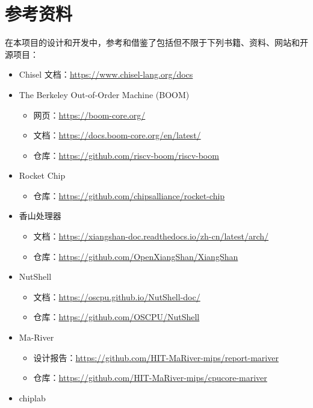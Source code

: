 \documentclass{article}
\begin{document}
\section{参考资料}
在本项目的设计和开发中，参考和借鉴了包括但不限于下列书籍、资料、网站和开源项目：
\begin{itemize}
    \item Chisel 文档：\url{https://www.chisel-lang.org/docs}
    \item The Berkeley Out-of-Order Machine (BOOM)
        \begin{itemize}
            \item 网页：\url{https://boom-core.org/}
            \item 文档：\url{https://docs.boom-core.org/en/latest/}
            \item 仓库：\url{https://github.com/riscv-boom/riscv-boom}
        \end{itemize}
    \item Rocket Chip
        \begin{itemize}
            \item 仓库：\url{https://github.com/chipsalliance/rocket-chip}
        \end{itemize}
    \item 香山处理器
        \begin{itemize}
            \item 文档：\url{https://xiangshan-doc.readthedocs.io/zh-cn/latest/arch/}
            \item 仓库：\url{https://github.com/OpenXiangShan/XiangShan}
        \end{itemize}
    \item NutShell
        \begin{itemize}
            \item 文档：\url{https://oscpu.github.io/NutShell-doc/}
            \item 仓库：\url{https://github.com/OSCPU/NutShell}
        \end{itemize}
    \item Ma-River
        \begin{itemize}
            \item 设计报告：\url{https://github.com/HIT-MaRiver-mips/report-mariver}
            \item 仓库：\url{https://github.com/HIT-MaRiver-mips/cpucore-mariver}
        \end{itemize}
    \item chiplab
        \begin{itemize}

\end{itemize}
\end{itemize}
\end{document}
